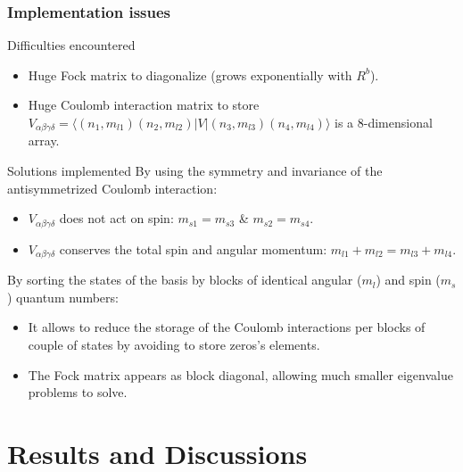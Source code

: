 \documentclass[xcolor=pdftex,hyperref={pdfpagelabels=false},table]{beamer}
\begin{document}
\begin{frame}
\frametitle{Implementation issues}
\begin{scriptsize}
\begin{alertblock}{Difficulties encountered}
 \begin{itemize}
\item Huge Fock matrix to diagonalize (grows exponentially with $R^b$).
\item Huge Coulomb interaction matrix to store $V_{\alpha \beta \gamma \delta}=\langle (n_1,m_{l1})(n_2,m_{l2})|V|(n_3,m_{l3})(n_4,m_{l4})\rangle$ is a 8-dimensional array.
\end{itemize}
\end{alertblock}
\begin{block}{Solutions implemented}
By using the symmetry and invariance of the antisymmetrized Coulomb interaction:
 \begin{itemize}
\item $V_{\alpha \beta \gamma \delta}$ does not act on spin: $m_{s1}=m_{s3}$ \& $m_{s2}=m_{s4}$.
\item $V_{\alpha \beta \gamma \delta}$ conserves the total spin and angular momentum: $m_{l1}+m_{l2}=m_{l3}+m_{l4}$.
\end{itemize}
  By sorting the states of the basis by blocks of identical angular ($m_l$) and spin ($m_s$) quantum numbers:
 \begin{itemize}
\item It allows to reduce the storage of the Coulomb interactions per blocks of couple of states by avoiding to store zeros's elements.
\item The Fock matrix appears as block diagonal, allowing much smaller eigenvalue problems to solve.
\end{itemize}
\end{block}
\end{scriptsize}
\end{frame}

\section{Results and Discussions}
\end{document}

